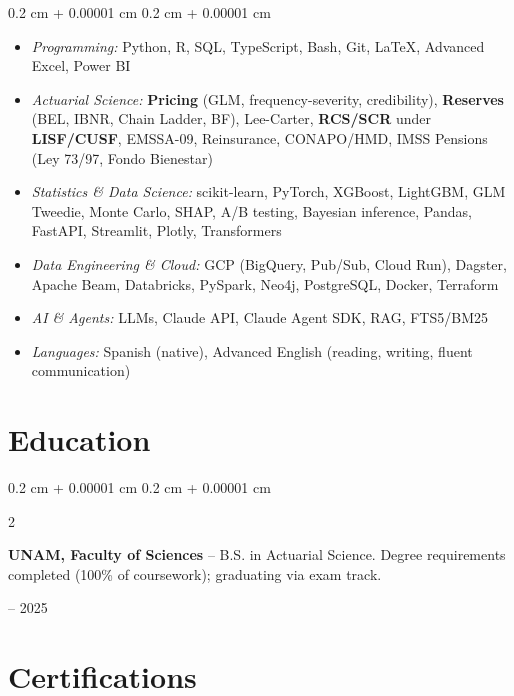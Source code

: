 \documentclass[10pt, letterpaper]{article}
\newenvironment{highlightsforbulletentries}{
    \begin{itemize}[
        topsep=0.02 cm,
        parsep=0.02 cm,
        partopsep=0pt,
        itemsep=0pt,
        leftmargin=10pt
    ]
}{
    \end{itemize}
}
\newenvironment{onecolentry}{
    \begin{adjustwidth}{
        0.2 cm + 0.00001 cm
    }{
        0.2 cm + 0.00001 cm
    }
}{
    \end{adjustwidth}
}
\newenvironment{twocolentry}[2][]{
    \onecolentry
    \def\secondColumn{#2}
    \setcolumnwidth{\fill, 4.0 cm}
    \begin{paracol}{2}
}{
    \switchcolumn \raggedleft \secondColumn
    \end{paracol}
    \endonecolentry
}
\let\hrefWithoutArrow\href
\renewcommand{\href}[2]{\hrefWithoutArrow{#1}{\ifthenelse{\equal{#2}{}}{ }{#2 }\raisebox{.15ex}{\footnotesize \faExternalLink*}}}
\begin{document}
\begin{onecolentry}
    \begin{highlightsforbulletentries}
        \item \textit{Programming:} Python, R, SQL, TypeScript, Bash, Git, \LaTeX, Advanced Excel, Power BI
        \item \textit{Actuarial Science:} \textbf{Pricing} (GLM, frequency-severity, credibility), \textbf{Reserves} (BEL, IBNR, Chain Ladder, BF), Lee-Carter, \textbf{RCS/SCR} under \textbf{LISF/CUSF}, EMSSA-09, Reinsurance, CONAPO/HMD, IMSS Pensions (Ley 73/97, Fondo Bienestar)
        \item \textit{Statistics \& Data Science:} scikit-learn, PyTorch, XGBoost, LightGBM, GLM Tweedie, Monte Carlo, SHAP, A/B testing, Bayesian inference, Pandas, FastAPI, Streamlit, Plotly, Transformers
        \item \textit{Data Engineering \& Cloud:} GCP (BigQuery, Pub/Sub, Cloud Run), Dagster, Apache Beam, Databricks, PySpark, Neo4j, PostgreSQL, Docker, Terraform
        \item \textit{AI \& Agents:} LLMs, Claude API, Claude Agent SDK, RAG, FTS5/BM25
        \item \textit{Languages:} Spanish (native), Advanced English (reading, writing, fluent communication)
    \end{highlightsforbulletentries}
\end{onecolentry}


    \section{Education}

        \begin{twocolentry}{2021 -- 2025}
            \textbf{UNAM, Faculty of Sciences} -- B.S. in Actuarial Science. Degree requirements completed (100\% of coursework); graduating via \href{https://www.soa.org/}{SOA} exam track.
        \end{twocolentry}

    \section{Certifications}
\end{document}

